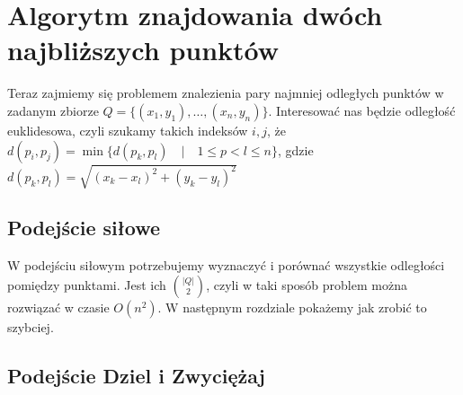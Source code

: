 \section{Algorytm znajdowania dwóch najbliższych punktów}

Teraz zajmiemy się problemem znalezienia pary najmniej odległych punktów w zadanym zbiorze $Q = \{(x_1, y_1), \ldots, (x_n, y_n)\}$.
Interesować nas będzie odległość euklidesowa, czyli szukamy takich indeksów $i, j$, że $d(p_i, p_j) = \min\{d(p_k, p_l) \quad | \quad 1 \leq p < l \leq n\}$, gdzie $d(p_k, p_l) = \sqrt{(x_k - x_l)^2 + (y_k - y_l)^2}$

\subsection{Podejście siłowe}

W podejściu siłowym potrzebujemy wyznaczyć i porównać wszystkie odległości pomiędzy punktami. 
Jest ich ${|Q|}\choose{2}$, czyli w taki sposób problem można rozwiązać w czasie $O(n^2)$. 
W następnym rozdziale pokażemy jak zrobić to szybciej.

\subsection{Podejście Dziel i Zwyciężaj}

